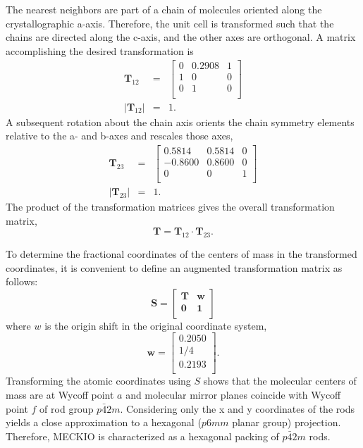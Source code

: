 \documentclass[preprint]{iucr}              %
\begin{document}
The nearest neighbors are part of a chain of molecules oriented along the crystallographic a-axis.  Therefore, the unit cell is transformed such that the chains are directed along the c-axis, and the other axes are orthogonal.  A matrix accomplishing the desired transformation is
\begin{eqnarray}
   \mathbf{T}_{12}&=&\left[
     \begin{array}{ccc}
        0& 0.2908& 1\\
        1& 0& 0\\
        0& 1& 0\\
     \end{array}
  \right]\\
   \vert\mathbf{T}_{12}\vert&=&1.
\end{eqnarray}
A subsequent rotation about the chain axis orients the chain symmetry elements relative to the a- and b-axes and rescales those axes,
\begin{eqnarray}
   \mathbf{T}_{23}&=&\left[
     \begin{array}{ccc}
        0.5814& 0.5814& 0\\
        -0.8600& 0.8600& 0\\
        0& 0& 1\\
     \end{array}
  \right]\\
   \vert\mathbf{T}_{23}\vert&=&1.
\end{eqnarray}
The product of the transformation matrices gives the overall transformation matrix,
\begin{equation}
\mathbf{T}=\mathbf{T}_{12}\cdot\mathbf{T}_{23}.
\end{equation}

To determine the fractional coordinates of the centers of mass in the transformed coordinates, it is convenient to define an augmented transformation matrix as follows:
\begin{equation}
   \mathbf{S}=\left[
     \begin{array}{cc}
        \mathbf{T}& \mathbf{w}\\
        \mathbf{0}& \mathbf{1}\\
     \end{array}
  \right]
\end{equation}
where $w$ is the origin shift in the original coordinate system,
\begin{equation}
   \mathbf{w}=\left[
     \begin{array}{c}
        0.2050\\
        1/4\\
        0.2193\\
     \end{array}
  \right].
\end{equation}
Transforming the atomic coordinates using $S$ shows that the molecular centers of mass are at Wycoff point $a$ and molecular mirror planes coincide with Wycoff point $f$ of rod group $p\bar{4}2m$.  Considering only the x and y coordinates of the rods yields a close approximation to a hexagonal ($p6mm$ planar group) projection.  Therefore, MECKIO is characterized as a hexagonal packing of $p\bar{4}2m$ rods.
\end{document}
